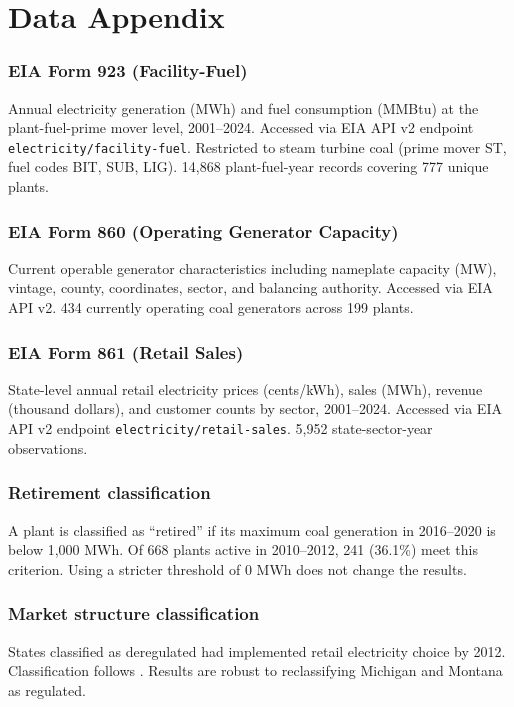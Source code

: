 \documentclass[12pt]{article}
\begin{document}
\newpage
\appendix

\section{Data Appendix}

\subsubsection*{EIA Form 923 (Facility-Fuel)} Annual electricity generation (MWh) and fuel consumption (MMBtu) at the plant-fuel-prime mover level, 2001--2024. Accessed via EIA API v2 endpoint \texttt{electricity/facility-fuel}. Restricted to steam turbine coal (prime mover ST, fuel codes BIT, SUB, LIG). 14,868 plant-fuel-year records covering 777 unique plants.

\subsubsection*{EIA Form 860 (Operating Generator Capacity)} Current operable generator characteristics including nameplate capacity (MW), vintage, county, coordinates, sector, and balancing authority. Accessed via EIA API v2. 434 currently operating coal generators across 199 plants.

\subsubsection*{EIA Form 861 (Retail Sales)} State-level annual retail electricity prices (cents/kWh), sales (MWh), revenue (thousand dollars), and customer counts by sector, 2001--2024. Accessed via EIA API v2 endpoint \texttt{electricity/retail-sales}. 5,952 state-sector-year observations.

\subsubsection*{Retirement classification} A plant is classified as ``retired'' if its maximum coal generation in 2016--2020 is below 1,000 MWh. Of 668 plants active in 2010--2012, 241 (36.1\%) meet this criterion. Using a stricter threshold of 0 MWh does not change the results.

\subsubsection*{Market structure classification} States classified as deregulated had implemented retail electricity choice by 2012. Classification follows \citet{borenstein2012private}. Results are robust to reclassifying Michigan and Montana as regulated.
\end{document}
